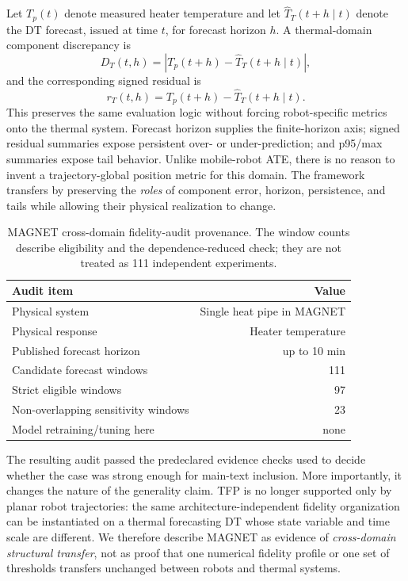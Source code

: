 \documentclass[journal]{IEEEtran}
\begin{document}
Let $T_p(t)$ denote measured heater temperature and let $\widehat{T}_T(t+h\mid t)$ denote the DT forecast, issued at time $t$, for forecast horizon $h$. A thermal-domain component discrepancy is
\begin{equation}
D_T(t,h)=\left|T_p(t+h)-\widehat{T}_T(t+h\mid t)\right|,
\end{equation}
and the corresponding signed residual is
\begin{equation}
r_T(t,h)=T_p(t+h)-\widehat{T}_T(t+h\mid t).
\end{equation}
This preserves the same evaluation logic without forcing robot-specific metrics onto the thermal system. Forecast horizon supplies the finite-horizon axis; signed residual summaries expose persistent over- or under-prediction; and p95/max summaries expose tail behavior. Unlike mobile-robot ATE, there is no reason to invent a trajectory-global position metric for this domain. The framework transfers by preserving the \emph{roles} of component error, horizon, persistence, and tails while allowing their physical realization to change.

\begin{table}[t]
\caption{MAGNET cross-domain fidelity-audit provenance. The window counts describe eligibility and the dependence-reduced check; they are not treated as 111 independent experiments.}
\label{tab:magnet}
\centering
\footnotesize
\setlength{\tabcolsep}{3.2pt}
\begin{tabular}{lr}
\toprule
Audit item & Value \\
\midrule
Physical system & Single heat pipe in MAGNET \\
Physical response & Heater temperature \\
Published forecast horizon & up to 10 min \\
Candidate forecast windows & 111 \\
Strict eligible windows & 97 \\
Non-overlapping sensitivity windows & 23 \\
Model retraining/tuning here & none \\
\bottomrule
\end{tabular}
\end{table}

The resulting audit passed the predeclared evidence checks used to decide whether the case was strong enough for main-text inclusion. More importantly, it changes the nature of the generality claim. TFP is no longer supported only by planar robot trajectories: the same architecture-independent fidelity organization can be instantiated on a thermal forecasting DT whose state variable and time scale are different. We therefore describe MAGNET as evidence of \emph{cross-domain structural transfer}, not as proof that one numerical fidelity profile or one set of thresholds transfers unchanged between robots and thermal systems.
\end{document}
